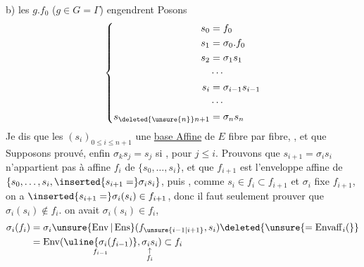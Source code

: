 b) les $g.f_0$ ($g\in G=\Gamma$) engendrent 
Posons
\[
\left\{\begin{aligned}
s_0&=f_0\\
s_1&=\sigma_0.f_0\\
s_2&=\sigma_1s_1\\
&\cdots\\
s_i&=\sigma_{i-1}s_{i-1}\\
&\cdots\\
s_{\deleted{\unsure{n}}n+1}&=\sigma_ns_n
\end{aligned}\right.
\]
Je dis que les $(s_i)_{0\leq i\leq n+1}$  une \uline{base Affine} de $E$ fibre par fibre,  , et que  Supposons prouvé,   enfin $\sigma_k s_j=s_j$ si ,  pour $j\leq i$. Prouvons que  $s_{i+1}=\sigma_i s_i$ n'appartient pas à  affine $f_i$ de $\{s_0,\ldots,s_i\}$, et  que $f_{i+1}$ est l'enveloppe affine de $\{s_0,\ldots,s_i,\inserted{s_{i+1}=}\sigma_i s_i\}$,  puis  , comme $s_i\in f_i\subset f_{i+1}$ et $\sigma_i$ fixe $f_{i+1}$, on a $\inserted{s_{i+1}=}\sigma_i(s_i)\in f_{i+1}$, donc il faut seulement prouver que $\sigma_i(s_i)\notin f_i$.  on avait $\sigma_i(s_i)\in f_i$,  
\[
\begin{aligned}
\sigma_i(f_i)&=\sigma_i\unsure{\operatorname{Env}|\operatorname{Ens}}(f_{\unsure{i-1|i+1}},s_i)\deleted{\unsure{=\operatorname{Envaff}_i(}}\\
&=\operatorname{Env}(\underset{f_{i-1}}{\uline{\sigma_i(f_{i-1})}},\underset{\substack{\uparrow\\f_i}}{\sigma_i s_i})\subset f_i
\end{aligned}
\]
